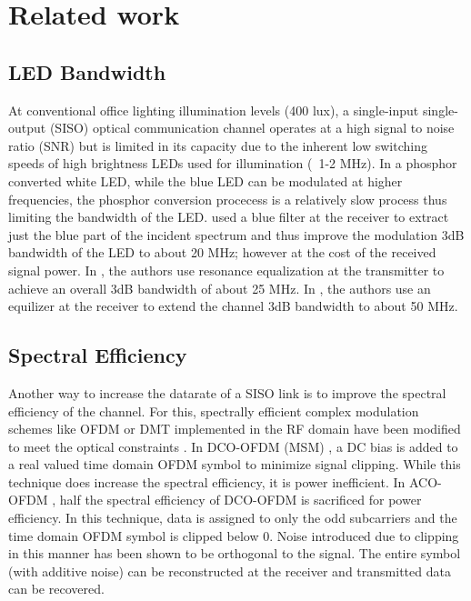 \section{Related work}
\label{sec:related}
\graphicspath{{_Intro/Figures/}}

\subsection{LED Bandwidth}
\label{relatedBandwidth}
At conventional office lighting illumination levels (400 lux), a single-input single-output (SISO) optical communication channel operates at a high signal to noise ratio (SNR) but is limited in its capacity due to the inherent low switching speeds of high brightness LEDs used for illumination (~1-2 MHz). In a phosphor converted white LED, while the blue LED can be modulated at higher frequencies, the phosphor conversion procecess is a relatively slow process thus limiting the bandwidth of the LED. \cite{gru08b} used a blue filter at the receiver to extract just the blue part of the incident spectrum and thus improve the modulation  3dB bandwidth of the LED to about 20 MHz; however at the cost of the received signal power.  In \cite{min08a}, the authors use resonance equalization at the transmitter to achieve an overall  3dB bandwidth of about 25 MHz. In \cite{zen08a}, the authors use an equilizer at the receiver to extend the channel  3dB bandwidth to about 50 MHz.

\subsection{Spectral Efficiency}
\label{relatedSpectral}
Another way to increase the datarate of a SISO link is to improve the spectral efficiency of the channel. For this, spectrally efficient complex modulation schemes like OFDM or DMT implemented in the RF domain have been modified to meet the optical constraints \cite{vuc09a,mes10a,mes10b,dis11a}. In DCO-OFDM (MSM) \cite{car96a}, a DC bias is added to a real valued time domain OFDM symbol to minimize signal clipping. While this technique does increase the spectral efficiency, it is power inefficient. In ACO-OFDM \cite{arm06a}, half the spectral efficiency of DCO-OFDM is sacrificed for power efficiency. In this technique, data is assigned to only the odd subcarriers and the time domain OFDM symbol is clipped below 0. Noise introduced due to clipping in this manner has been shown to be orthogonal to the signal. The entire symbol (with additive noise) can be reconstructed at the receiver and transmitted data can be recovered. 


